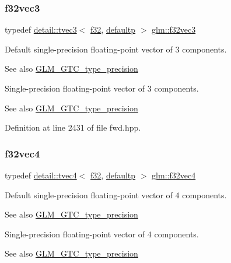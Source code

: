 \subsubsection{\texorpdfstring{f32vec3}{f32vec3}}
{\footnotesize\ttfamily typedef \hyperlink{structglm_1_1detail_1_1tvec3}{detail\+::tvec3}$<$ \hyperlink{group__gtc__type__precision_ga0ec999b57f5330d9021256e96038df04}{f32}, \hyperlink{namespaceglm_a0f04f086094c747d227af4425893f545a9d21ccd8b5a009ec7eb7677befc3bf51}{defaultp} $>$ \hyperlink{group__gtc__type__precision_ga9b74939fb3bdd450be65f798037dd79d}{glm\+::f32vec3}}

Default single-\/precision floating-\/point vector of 3 components. \begin{DoxySeeAlso}{See also}
\hyperlink{group__gtc__type__precision}{G\+L\+M\+\_\+\+G\+T\+C\+\_\+type\+\_\+precision}
\end{DoxySeeAlso}
Single-\/precision floating-\/point vector of 3 components. \begin{DoxySeeAlso}{See also}
\hyperlink{group__gtc__type__precision}{G\+L\+M\+\_\+\+G\+T\+C\+\_\+type\+\_\+precision} 
\end{DoxySeeAlso}


Definition at line 2431 of file fwd.\+hpp.

\mbox{\label{group__gtc__type__precision_gab6254ab9d409cce6579d7dc75dd34114}} 
\subsubsection{\texorpdfstring{f32vec4}{f32vec4}}
{\footnotesize\ttfamily typedef \hyperlink{structglm_1_1detail_1_1tvec4}{detail\+::tvec4}$<$ \hyperlink{group__gtc__type__precision_ga0ec999b57f5330d9021256e96038df04}{f32}, \hyperlink{namespaceglm_a0f04f086094c747d227af4425893f545a9d21ccd8b5a009ec7eb7677befc3bf51}{defaultp} $>$ \hyperlink{group__gtc__type__precision_gab6254ab9d409cce6579d7dc75dd34114}{glm\+::f32vec4}}

Default single-\/precision floating-\/point vector of 4 components. \begin{DoxySeeAlso}{See also}
\hyperlink{group__gtc__type__precision}{G\+L\+M\+\_\+\+G\+T\+C\+\_\+type\+\_\+precision}
\end{DoxySeeAlso}
Single-\/precision floating-\/point vector of 4 components. \begin{DoxySeeAlso}{See also}
\hyperlink{group__gtc__type__precision}{G\+L\+M\+\_\+\+G\+T\+C\+\_\+type\+\_\+precision} 
\end{DoxySeeAlso}


